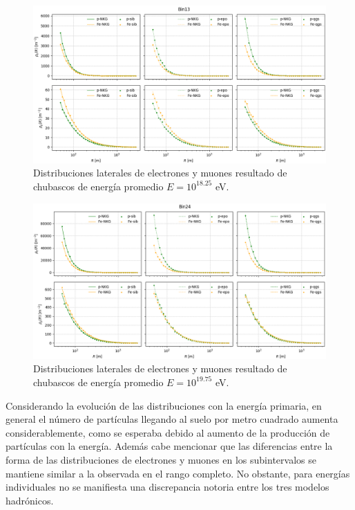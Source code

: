 \begin{figure}[] 
\centering
\includegraphics[width=\textwidth]{Figuras/distlat_bin13}
\caption{Distribuciones laterales de electrones y muones resultado de chubascos de energía promedio $E=10^{18.25}$ eV.}
\label{fig:distlat_bin13}
\end{figure}

\begin{figure}[] 
\centering
\includegraphics[width=\textwidth]{Figuras/distlat_bin24}
\caption{Distribuciones laterales de electrones y muones resultado de chubascos de energía promedio $E=10^{19.75}$ eV.}
\label{fig:distlat_bin24}
\end{figure}

Considerando la evolución de las distribuciones con la energía primaria, en general el número de partículas llegando al suelo por metro cuadrado aumenta considerablemente, como se esperaba debido al aumento de la producción de partículas con la energía. Además cabe mencionar que las diferencias entre la forma de las distribuciones de electrones y muones en los subintervalos se mantiene similar a la observada en el rango completo. No obstante, para energías individuales no se manifiesta una discrepancia notoria entre los tres modelos hadrónicos.\\

